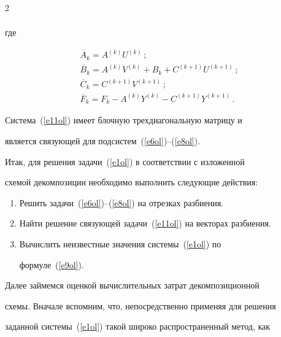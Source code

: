 \begin{multicols}{2}
\begin{multline}
\end{multline}


где


\begin{gather*}


\overline{A}_k  = A^{(k)}U^{(k)}\,;\\


\overline{B}_k  = A^{(k)}V^{(k)}+B_k+C^{(k+1)}U^{(k+1)}\,;\\


\overline{C}_k  = C^{(k+1)}V^{(k+1)}\,;\\


\overline{F}_k  = F_k - A^{(k)}Y^{(k)} - C^{(k+1)}


Y^{(k+1)}\,.


\end{gather*}





     Система~(\ref{e11ol}) имеет блочную трехдиагональную матрицу и


является связующей для под\-сис\-тем~\mbox{(\ref{e6ol})--(\ref{e8ol}).}





     Итак, для решения задачи~(\ref{e1ol}) в соответствии с изложенной


схемой декомпозиции необходимо выполнить следующие действия:


     \begin{enumerate}[1.]


\item Решить задачи~(\ref{e6ol})--(\ref{e8ol}) на отрезках разбиения.


\item Найти решение связующей задачи~(\ref{e11ol}) на векторах разбиения.


\item Вычислить неизвестные значения системы~(\ref{e1ol}) по


формуле~(\ref{e9ol}).


     \end{enumerate}





     Далее займемся оценкой вычислительных затрат декомпозиционной


схемы. Вначале вспомним, что, непосредственно применяя для решения


заданной системы~(\ref{e1ol}) такой широко распространенный метод, как



\end{multicols}
